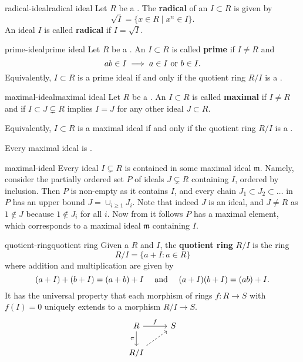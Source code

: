 \begin{topic}{radical-ideal}{radical ideal}
    Let $R$ be a . The \textbf{radical} of an  $I \subset R$ is given by
    \[ \sqrt{I} = \{ x \in R \mid x^n \in I \} . \]
    An ideal $I$ is called \textbf{radical} if $I = \sqrt{I}$.
\end{topic}

\begin{topic}{prime-ideal}{prime ideal}
    Let $R$ be a . An  $I \subset R$ is called \textbf{prime} if $I \ne R$ and
    \[ ab \in I \implies a \in I \textup{ or } b \in I . \]
    Equivalently, $I \subset R$ is a prime ideal if and only if the quotient ring $R / I$ is a .
\end{topic}

\begin{topic}{maximal-ideal}{maximal ideal}
    Let $R$ be a . An  $I \subset R$ is called \textbf{maximal} if $I \ne R$ and if $I \subset J \subsetneq R$ implies $I = J$ for any other ideal $J \subset R$.
    
    Equivalently, $I \subset R$ is a maximal ideal if and only if the quotient ring $R / I$ is a .
    
    Every maximal ideal is .
\end{topic}

\begin{example}{maximal-ideal}
    Every ideal $I \subsetneq R$ is contained in some maximal ideal $\mathfrak{m}$. Namely, consider the partially ordered set $P$ of ideals $J \subsetneq R$ containing $I$, ordered by inclusion. Then $P$ is non-empty as it contains $I$, and every chain $J_1 \subset J_2 \subset \ldots$ in $P$ has an upper bound $J = \cup_{i \ge 1} J_i$. Note that indeed $J$ is an ideal, and $J \ne R$ as $1 \not\in J$ because $1 \not\in J_i$ for all $i$.
    Now from  it follows $P$ has a maximal element, which corresponds to a maximal ideal $\mathfrak{m}$ containing $I$.
\end{example}

\begin{topic}{quotient-ring}{quotient ring}
    Given a  $R$ and  $I$, the \textbf{quotient ring} $R/I$ is the ring
    \[ R/I = \{ a + I : a \in R \} \]
    where addition and multiplication are given by
    \[ (a + I) + (b + I) = (a + b) + I \quad \textup{ and } \quad (a + I) (b + I) = (ab) + I . \]
    It has the universal property that each morphism of rings $f : R \to S$ with $f(I) = 0$ uniquely extends to a morphism $R/I \to S$.
    \[ \begin{tikzcd} R \arrow{r}{f} \arrow[swap]{d}{\pi} & S \\ R/I \arrow[dashed]{ur} & \end{tikzcd} \]
\end{topic}

